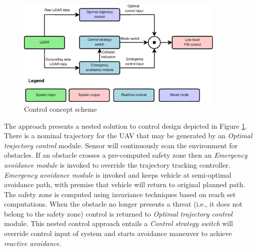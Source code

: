 \begin{figure}[H]
    \centering
    \includegraphics[width=10cm]{Pics/35_ControlConcept.eps}
    \caption{Control concept scheme}
    \label{fig:ControlConcept}
\end{figure}
\noindent
The approach presents a nested solution to control design depicted in Figure \ref{fig:ControlConcept}. There is a nominal trajectory for the UAV that may be generated by an  \textit{Optimal trajectory control} module. Sensor will continuously scan the environment for obstacles. If an obstacle crosses a pre-computed safety zone then an \textit{Emergency avoidance module} is invoked to override the trajectory tracking controller. \textit{Emergency avoidance module} is invoked and keeps vehicle at semi-optimal avoidance path, with premise that vehicle will return to original planned path. The safety zone is computed using invariance techniques based on reach set computations. When the obstacle no longer presents a threat (i.e., it does not belong to the safety zone) control is returned to \textit{Optimal trajectory control} module. This nested control approach entails  a \textit{Control strategy switch} will override control input of system and starts avoidance maneuver to achieve \textit{reactive avoidance}.



